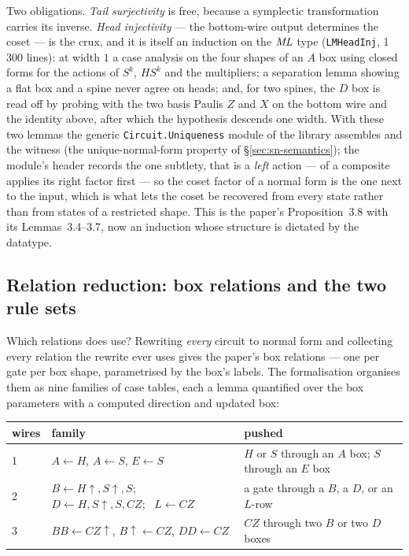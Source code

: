 Two obligations.  \emph{Tail surjectivity} is free, because a
symplectic transformation carries its inverse.  \emph{Head injectivity}
--- the bottom-wire output determines the coset --- is the crux, and it
is itself an induction on the $\mathit{ML}$ type (\texttt{LMHeadInj},
1\,300 lines): at width $1$ a case analysis on the four shapes of an
$A$ box using closed forms for the actions of $S^{k}$, $HS^{k}$ and the
multipliers; a separation lemma showing a flat box and a spine never
agree on heads; and, for two spines, the $D$ box is read off by probing
with the two basis Paulis $Z$ and $X$ on the bottom wire and the identity
above, after which the hypothesis descends one width.  With these two
lemmas the generic \texttt{Circuit.Uniqueness} module of the library
assembles  and the  witness
(the unique-normal-form property of \S\ref{sec:sn-semantics});
the module's header records the one subtlety, that  is a
\emph{left} action ---  of a composite applies its right factor
first --- so the coset factor of a normal form is the one next to the
input, which is what lets the coset be recovered from every state rather
than from states of a restricted shape.  This is the paper's
Proposition~3.8 with its Lemmas~3.4--3.7, now an induction whose
structure is dictated by the datatype.

\subsection{Relation reduction: box relations and the two rule sets}\label{sec:reduction}

Which relations does  use?  Rewriting \emph{every}
circuit to normal form and collecting every relation the rewrite ever
uses gives the paper's box relations --- one per gate per box shape,
parametrised by the box's labels.  The formalisation organises them as
nine families of case tables, each a lemma quantified over the box
parameters with a computed direction  and updated box:

\begin{center}\small
\begin{tabular}{@{}lll@{}}
\toprule
wires & family & pushed \\
\midrule
1 & $A \leftarrow H$, $A \leftarrow S$, $E \leftarrow S$ & $H$ or $S$ through an $A$ box; $S$ through an $E$ box \\
2 & $B \leftarrow H{\uparrow},S{\uparrow},S$; \ $D \leftarrow H,S{\uparrow},S,CZ$; \ $L \leftarrow CZ$ & a gate through a $B$, a $D$, or an $L$-row \\
3 & $BB \leftarrow CZ{\uparrow}$, $B{\uparrow} \leftarrow CZ$, $DD \leftarrow CZ$ & $CZ$ through two $B$ or two $D$ boxes \\
\bottomrule
\end{tabular}
\end{center}

